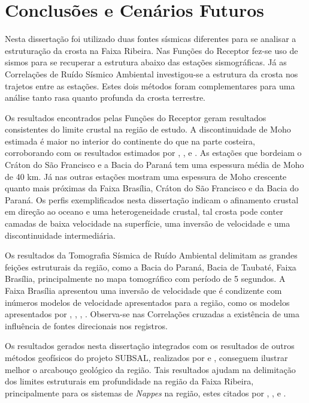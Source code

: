 \chapter{Conclusões e Cenários Futuros}

Nesta dissertação foi utilizado duas fontes sísmicas diferentes para se analisar a estruturação da crosta na Faixa Ribeira. Nas Funções do Receptor fez-se uso de sismos para se recuperar a estrutura abaixo das estações sismográficas. Já as Correlações de Ruído Sísmico Ambiental investigou-se a estrutura da crosta nos trajetos entre as estações. Estes dois métodos foram complementares para uma análise tanto rasa quanto profunda da crosta terrestre.

Os resultados encontrados pelas Funções do Receptor geram resultados consistentes do limite crustal na região de estudo. A discontinuidade de Moho estimada é maior no interior do continente do que na parte costeira, corroborando com os resultados estimados por \cite{sand_franca_crustal_2004}, \cite{Assumpcao_America_2013}, \cite{Assumpcao_Brazil_2013} e \cite{van_der_meijde_gravity_2013}. As estações que bordeiam o Cráton do São Francisco e a Bacia do Paraná tem uma espessura média de Moho de 40 km. Já nas outras estações mostram uma espessura de Moho crescente quanto mais próximas da Faixa Brasília, Cráton do São Francisco e da Bacia do Paraná. Os perfis exemplificados nesta dissertação indicam o afinamento crustal em direção ao oceano e uma heterogeneidade crustal, tal crosta pode conter camadas de baixa velocidade na superfície, uma inversão de velocidade e uma discontinuidade intermediária.

Os resultados da Tomografia Sísmica de Ruído Ambiental delimitam as grandes feições estruturais da região, como a Bacia do Paraná, Bacia de Taubaté, Faixa Brasília, principalmente no mapa tomográfico com período de 5 segundos. A Faixa Brasília apresentou uma inversão de velocidade que é condizente com inúmeros modelos de velocidade apresentados para a região, como os modelos apresentados por \cite{sand_franca_crustal_2004}, \cite{dias_cario_crustal_2006}, \cite{flora_solon_ancient_2013}, \cite{Silva_2014}. Observa-se nas Correlações cruzadas a existência de uma influência de fontes direcionais nos registros. 

Os resultados gerados nesta dissertação integrados com os resultados de outros métodos geofísicos do projeto SUBSAL, realizados por \cite{flora_solon_ancient_2013} e \cite{Silva_2014}, conseguem ilustrar melhor o arcabouço geológico da região. Tais resultados ajudam na delimitação dos limites estruturais em profundidade na região da Faixa Ribeira, principalmente para os sistemas de \textit{Nappes} na região, estes citados por  \cite{heilbron_evolution_2010}, \cite{valeriano_u_pb_2011},  \cite{heilbron_serra_2013} e \cite{trouw_new_2013}. 

